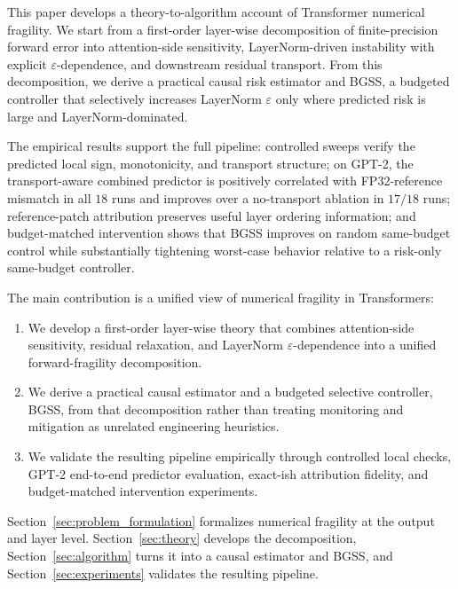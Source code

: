 \documentclass[twoside]{article}
\theoremstyle{definition}
\theoremstyle{remark}
\begin{document}
This paper develops a theory-to-algorithm account of Transformer numerical
fragility. We start from a first-order layer-wise decomposition of
finite-precision forward error into attention-side sensitivity,
LayerNorm-driven instability with explicit $\varepsilon$-dependence, and
downstream residual transport. From this decomposition, we derive a practical
causal risk estimator and BGSS, a budgeted controller that selectively
increases LayerNorm $\varepsilon$ only where predicted risk is large and
LayerNorm-dominated.

The empirical results support the full pipeline: controlled sweeps verify the
predicted local sign, monotonicity, and transport structure; on GPT-2, the
transport-aware combined predictor is positively correlated with FP32-reference
mismatch in all $18$ runs and improves over a no-transport ablation in $17/18$
runs; reference-patch attribution preserves useful layer ordering information;
and budget-matched intervention shows that BGSS improves on random same-budget
control while substantially tightening worst-case behavior relative to a
risk-only same-budget controller.

The main contribution is a unified view of numerical fragility in Transformers:
\vspace{-1em}
\begin{enumerate}[leftmargin=1.2em]
  \item We develop a first-order layer-wise theory that combines
  attention-side sensitivity, residual relaxation, and LayerNorm
  $\varepsilon$-dependence into a unified forward-fragility decomposition.

  \vspace{-0.5em}

  \item We derive a practical causal estimator and a budgeted selective controller, BGSS, from that decomposition rather than treating monitoring and mitigation as unrelated engineering heuristics.

  \vspace{-0.5em}

  \item We validate the resulting pipeline empirically through controlled local checks, GPT-2 end-to-end predictor evaluation, exact-ish attribution fidelity, and budget-matched intervention experiments.
\end{enumerate}

\vspace{-1em}

Section~\ref{sec:problem_formulation} formalizes numerical fragility at the
output and layer level. Section~\ref{sec:theory} develops the decomposition,
Section~\ref{sec:algorithm} turns it into a causal estimator and BGSS, and
Section~\ref{sec:experiments} validates the resulting pipeline.
\end{document}
